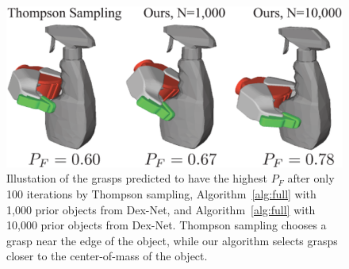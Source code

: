 \begin{figure}[t!]
\centering
\includegraphics[scale=0.28]{figures/illustrations/spray_grasps.eps}
\caption{Illustation of the grasps predicted to have the highest $P_F$ after only 100 iterations by Thompson sampling, Algorithm~\ref{alg:full} with 1,000 prior objects from Dex-Net, and Algorithm~\ref{alg:full} with 10,000 prior objects from Dex-Net. Thompson sampling chooses a grasp near the edge of the object, while our algorithm selects grasps closer to the center-of-mass of the object.}
\vspace*{-5pt}
\end{figure}


